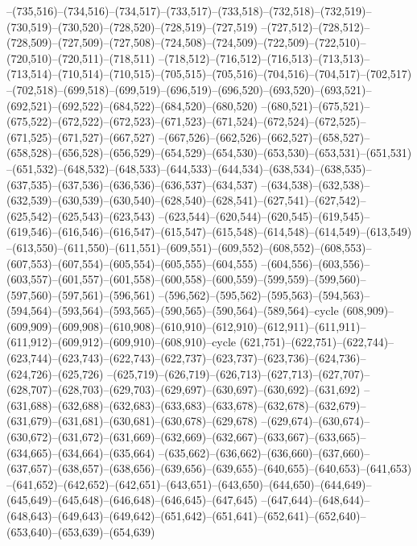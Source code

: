 --(735,516)--(734,516)--(734,517)--(733,517)--(733,518)--(732,518)--(732,519)--(730,519)--(730,520)--(728,520)--(728,519)--(727,519)
--(727,512)--(728,512)--(728,509)--(727,509)--(727,508)--(724,508)--(724,509)--(722,509)--(722,510)--(720,510)--(720,511)--(718,511)
--(718,512)--(716,512)--(716,513)--(713,513)--(713,514)--(710,514)--(710,515)--(705,515)--(705,516)--(704,516)--(704,517)--(702,517)
--(702,518)--(699,518)--(699,519)--(696,519)--(696,520)--(693,520)--(693,521)--(692,521)--(692,522)--(684,522)--(684,520)--(680,520)
--(680,521)--(675,521)--(675,522)--(672,522)--(672,523)--(671,523)--(671,524)--(672,524)--(672,525)--(671,525)--(671,527)--(667,527)
--(667,526)--(662,526)--(662,527)--(658,527)--(658,528)--(656,528)--(656,529)--(654,529)--(654,530)--(653,530)--(653,531)--(651,531)
--(651,532)--(648,532)--(648,533)--(644,533)--(644,534)--(638,534)--(638,535)--(637,535)--(637,536)--(636,536)--(636,537)--(634,537)
--(634,538)--(632,538)--(632,539)--(630,539)--(630,540)--(628,540)--(628,541)--(627,541)--(627,542)--(625,542)--(625,543)--(623,543)
--(623,544)--(620,544)--(620,545)--(619,545)--(619,546)--(616,546)--(616,547)--(615,547)--(615,548)--(614,548)--(614,549)--(613,549)
--(613,550)--(611,550)--(611,551)--(609,551)--(609,552)--(608,552)--(608,553)--(607,553)--(607,554)--(605,554)--(605,555)--(604,555)
--(604,556)--(603,556)--(603,557)--(601,557)--(601,558)--(600,558)--(600,559)--(599,559)--(599,560)--(597,560)--(597,561)--(596,561)
--(596,562)--(595,562)--(595,563)--(594,563)--(594,564)--(593,564)--(593,565)--(590,565)--(590,564)--(589,564)--cycle
(608,909)--(609,909)--(609,908)--(610,908)--(610,910)--(612,910)--(612,911)--(611,911)--(611,912)--(609,912)--(609,910)--(608,910)--cycle
(621,751)--(622,751)--(622,744)--(623,744)--(623,743)--(622,743)--(622,737)--(623,737)--(623,736)--(624,736)--(624,726)--(625,726)
--(625,719)--(626,719)--(626,713)--(627,713)--(627,707)--(628,707)--(628,703)--(629,703)--(629,697)--(630,697)--(630,692)--(631,692)
--(631,688)--(632,688)--(632,683)--(633,683)--(633,678)--(632,678)--(632,679)--(631,679)--(631,681)--(630,681)--(630,678)--(629,678)
--(629,674)--(630,674)--(630,672)--(631,672)--(631,669)--(632,669)--(632,667)--(633,667)--(633,665)--(634,665)--(634,664)--(635,664)
--(635,662)--(636,662)--(636,660)--(637,660)--(637,657)--(638,657)--(638,656)--(639,656)--(639,655)--(640,655)--(640,653)--(641,653)
--(641,652)--(642,652)--(642,651)--(643,651)--(643,650)--(644,650)--(644,649)--(645,649)--(645,648)--(646,648)--(646,645)--(647,645)
--(647,644)--(648,644)--(648,643)--(649,643)--(649,642)--(651,642)--(651,641)--(652,641)--(652,640)--(653,640)--(653,639)--(654,639)
